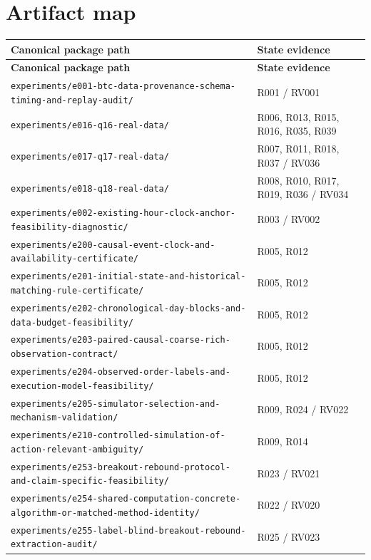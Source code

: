 \documentclass[10pt,a4paper]{article}
\begin{document}
\section{Artifact map}
\begingroup\footnotesize\renewcommand{\arraystretch}{1.12}
\begin{longtable}{@{}p{}p{}@{}}
\toprule\textbf{Canonical package path} & \textbf{State evidence}\\\midrule\endfirsthead
\toprule\textbf{Canonical package path} & \textbf{State evidence}\\\midrule\endhead
\nolinkurl{experiments/e001-btc-data-provenance-schema-timing-and-replay-audit/} & R001 / RV001\\
\nolinkurl{experiments/e016-q16-real-data/} & R006, R013, R015, R016, R035, R039\\
\nolinkurl{experiments/e017-q17-real-data/} & R007, R011, R018, R037 / RV036\\
\nolinkurl{experiments/e018-q18-real-data/} & R008, R010, R017, R019, R036 / RV034\\
\nolinkurl{experiments/e002-existing-hour-clock-anchor-feasibility-diagnostic/} & R003 / RV002\\
\nolinkurl{experiments/e200-causal-event-clock-and-availability-certificate/} & R005, R012\\
\nolinkurl{experiments/e201-initial-state-and-historical-matching-rule-certificate/} & R005, R012\\
\nolinkurl{experiments/e202-chronological-day-blocks-and-data-budget-feasibility/} & R005, R012\\
\nolinkurl{experiments/e203-paired-causal-coarse-rich-observation-contract/} & R005, R012\\
\nolinkurl{experiments/e204-observed-order-labels-and-execution-model-feasibility/} & R005, R012\\
\nolinkurl{experiments/e205-simulator-selection-and-mechanism-validation/} & R009, R024 / RV022\\
\nolinkurl{experiments/e210-controlled-simulation-of-action-relevant-ambiguity/} & R009, R014\\
\nolinkurl{experiments/e253-breakout-rebound-protocol-and-claim-specific-feasibility/} & R023 / RV021\\
\nolinkurl{experiments/e254-shared-computation-concrete-algorithm-or-matched-method-identity/} & R022 / RV020\\
\nolinkurl{experiments/e255-label-blind-breakout-rebound-extraction-audit/} & R025 / RV023\\

\end{longtable}
\end{document}
